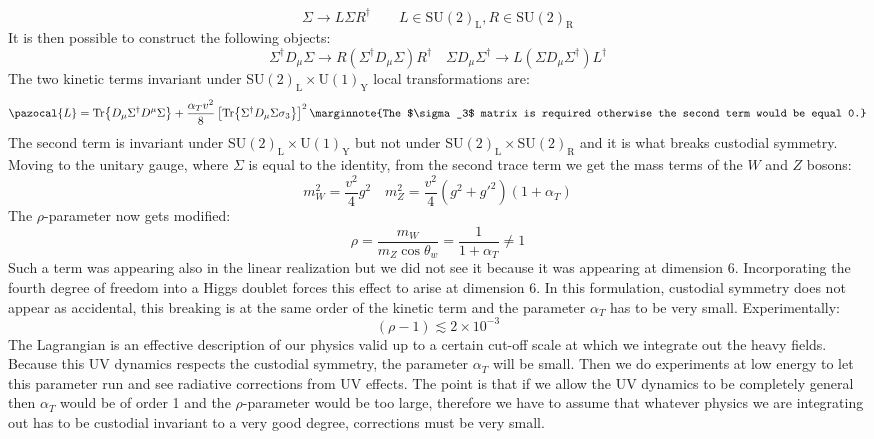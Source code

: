 \documentclass[../main.tex]{subfiles}
\begin{document}
\[
\Sigma\to L\Sigma R^\dagger \qquad L\in\text{SU}(2)_{\text{L}}, R\in\text{SU}(2)_{\text{R}}
\]
It is then possible to construct the following objects:
\[
\Sigma^\dagger D_\mu\Sigma\to R(\Sigma^\dagger D_\mu\Sigma)R^\dagger \quad \Sigma D_\mu\Sigma^\dagger\to L(\Sigma D_\mu\Sigma^\dagger)L^\dagger
\]
The two kinetic terms invariant under SU$(2)_{\text{L}}\times$U$(1)_{\text{Y}}$ local transformations are:
\[
\pazocal{L}=\Tr{D_\mu\Sigma^\dagger D^\mu\Sigma}+\frac{\alpha_Tv^2}{8}\left[\Tr{\Sigma^\dagger D_\mu\Sigma\sigma_3}\right]^2
\marginnote{The $\sigma_3$ matrix is required otherwise the second term would be equal 0.}
\]
The second term is invariant under SU$(2)_{\text{L}}\times$U$(1)_{\text{Y}}$ but not under SU$(2)_{\text{L}}\times$SU$(2)_{\text{R}}$ and it is what breaks custodial symmetry. Moving to the unitary gauge, where $\Sigma$ is equal to the identity, from the second trace term we get the mass terms of the $W$ and $Z$ bosons:
\[
m_W^2=\frac{v^2}{4}g^2 \quad m_Z^2=\frac{v^2}{4}(g^2+g'^2)(1+\alpha_T)
\]
The $\rho$-parameter now gets modified:
\[
\rho=\frac{m_W}{m_Z\cos\theta_w}=\frac{1}{1+\alpha_T}\neq1
\]
Such a term was appearing also in the linear realization but we did not see it because it was appearing at dimension 6. Incorporating the fourth degree of freedom into a Higgs doublet forces this effect to arise at dimension 6. In this formulation, custodial symmetry does not appear as accidental, this breaking is at the same order of the kinetic term and the parameter $\alpha_T$ has to be very small. Experimentally:
\[
(\rho-1)\lesssim2\times10^{-3}
\]
The Lagrangian is an effective description of our physics valid up to a certain cut-off scale at which we integrate out the heavy fields. Because this UV dynamics respects the custodial symmetry, the parameter $\alpha_T$ will be small. Then we do experiments at low energy to let this parameter run and see radiative corrections from UV effects. The point is that if we allow the UV dynamics to be completely general then $\alpha_T$ would be of order 1 and the $\rho$-parameter would be too large, therefore we have to assume that whatever physics we are integrating out has to be custodial invariant to a very good degree, corrections must be very small.\\
\end{document}
